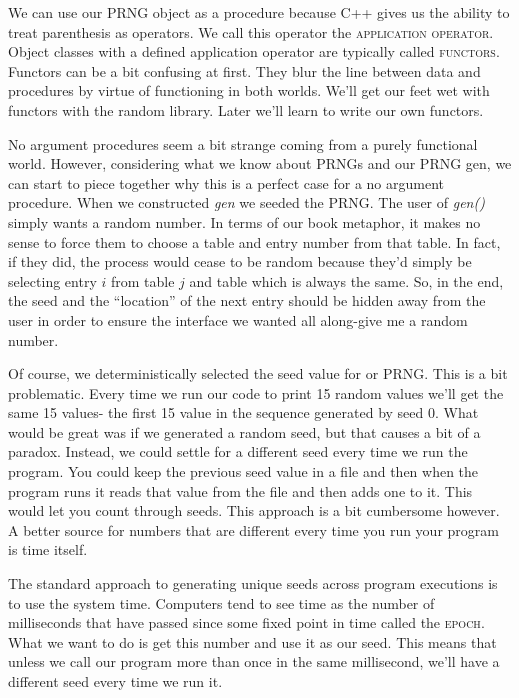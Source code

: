 \documentclass[]{tufte-handout}
\begin{document}
We can use our PRNG object as a procedure because C++ gives us the ability to treat parenthesis as operators. We call this operator the \textsc{application operator}.  Object classes with a defined application operator are typically called \textsc{functors}. Functors can be a bit confusing at first. They blur the line between data and procedures by virtue of functioning in both worlds. We'll get our feet wet with functors with the random library. Later we'll learn to write our own functors.

No argument procedures seem a bit strange coming from a purely functional world. However, considering what we know about PRNGs and our PRNG gen, we can start to piece together why this is a perfect case for a no argument procedure. When we constructed \textit{gen} we seeded the PRNG.  The user of \textit{gen()} simply wants a random number. In terms of our book metaphor, it makes no sense to force them to choose a table and entry number from that table. In fact, if they did, the process would cease to be random because they'd simply be selecting entry $i$ from table $j$ and table which is always the same.  So, in the end, the seed and the ``location'' of the next entry should be hidden away from the user in order to ensure the interface we wanted all along-give me a random number. 

Of course, we deterministically selected the seed value for or PRNG.  This is a bit problematic. Every time we run our code to print 15 random values we'll get the same 15 values- the first 15 value in the sequence generated by seed 0. What would be great was if we generated a random seed, but that causes a bit of a paradox. Instead, we could settle for a different seed every time we run the program. You could keep the previous seed value in a file and then when the program runs it reads that value from the file and then adds one to it. This would let you count through seeds. This approach is a bit cumbersome however. A better source for numbers that are different every time you run your program is time itself.

The standard approach to generating unique seeds across program executions is to use the system time. Computers tend to see time as the number of milliseconds that have passed since some fixed point in time called the \textsc{epoch}.  What we want to do is get this number and use it as our seed. This means that unless we call our program more than once in the same millisecond, we'll have a different seed every time we run it. 
\end{document}

